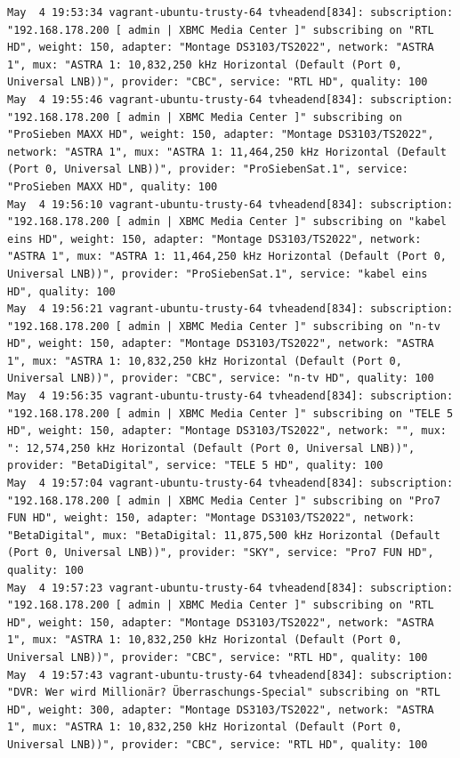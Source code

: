 \begin{cmd}[H]
\begin{Verbatim}[fontsize=\tiny]
May  4 19:53:34 vagrant-ubuntu-trusty-64 tvheadend[834]: subscription: "192.168.178.200 [ admin | XBMC Media Center ]" subscribing on "RTL HD", weight: 150, adapter: "Montage DS3103/TS2022", network: "ASTRA 1", mux: "ASTRA 1: 10,832,250 kHz Horizontal (Default (Port 0, Universal LNB))", provider: "CBC", service: "RTL HD", quality: 100
May  4 19:55:46 vagrant-ubuntu-trusty-64 tvheadend[834]: subscription: "192.168.178.200 [ admin | XBMC Media Center ]" subscribing on "ProSieben MAXX HD", weight: 150, adapter: "Montage DS3103/TS2022", network: "ASTRA 1", mux: "ASTRA 1: 11,464,250 kHz Horizontal (Default (Port 0, Universal LNB))", provider: "ProSiebenSat.1", service: "ProSieben MAXX HD", quality: 100
May  4 19:56:10 vagrant-ubuntu-trusty-64 tvheadend[834]: subscription: "192.168.178.200 [ admin | XBMC Media Center ]" subscribing on "kabel eins HD", weight: 150, adapter: "Montage DS3103/TS2022", network: "ASTRA 1", mux: "ASTRA 1: 11,464,250 kHz Horizontal (Default (Port 0, Universal LNB))", provider: "ProSiebenSat.1", service: "kabel eins HD", quality: 100
May  4 19:56:21 vagrant-ubuntu-trusty-64 tvheadend[834]: subscription: "192.168.178.200 [ admin | XBMC Media Center ]" subscribing on "n-tv HD", weight: 150, adapter: "Montage DS3103/TS2022", network: "ASTRA 1", mux: "ASTRA 1: 10,832,250 kHz Horizontal (Default (Port 0, Universal LNB))", provider: "CBC", service: "n-tv HD", quality: 100
May  4 19:56:35 vagrant-ubuntu-trusty-64 tvheadend[834]: subscription: "192.168.178.200 [ admin | XBMC Media Center ]" subscribing on "TELE 5 HD", weight: 150, adapter: "Montage DS3103/TS2022", network: "", mux: ": 12,574,250 kHz Horizontal (Default (Port 0, Universal LNB))", provider: "BetaDigital", service: "TELE 5 HD", quality: 100
May  4 19:57:04 vagrant-ubuntu-trusty-64 tvheadend[834]: subscription: "192.168.178.200 [ admin | XBMC Media Center ]" subscribing on "Pro7 FUN HD", weight: 150, adapter: "Montage DS3103/TS2022", network: "BetaDigital", mux: "BetaDigital: 11,875,500 kHz Horizontal (Default (Port 0, Universal LNB))", provider: "SKY", service: "Pro7 FUN HD", quality: 100
May  4 19:57:23 vagrant-ubuntu-trusty-64 tvheadend[834]: subscription: "192.168.178.200 [ admin | XBMC Media Center ]" subscribing on "RTL HD", weight: 150, adapter: "Montage DS3103/TS2022", network: "ASTRA 1", mux: "ASTRA 1: 10,832,250 kHz Horizontal (Default (Port 0, Universal LNB))", provider: "CBC", service: "RTL HD", quality: 100
May  4 19:57:43 vagrant-ubuntu-trusty-64 tvheadend[834]: subscription: "DVR: Wer wird Millionär? Überraschungs-Special" subscribing on "RTL HD", weight: 300, adapter: "Montage DS3103/TS2022", network: "ASTRA 1", mux: "ASTRA 1: 10,832,250 kHz Horizontal (Default (Port 0, Universal LNB))", provider: "CBC", service: "RTL HD", quality: 100

\end{Verbatim}
\end{cmd}
